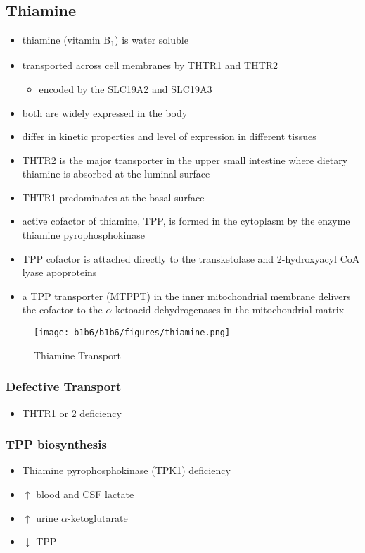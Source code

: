 \documentclass{scrartcl}
\begin{document}
\subsection{Thiamine}
\label{sec:orgb77186b}
\begin{itemize}
\item thiamine (vitamin B\textsubscript{1}) is water soluble
\item transported across cell membranes by THTR1 and THTR2
\begin{itemize}
\item encoded by the SLC19A2 and SLC19A3
\end{itemize}
\item both are widely expressed in the body
\item differ in kinetic properties and level of expression in different tissues
\item THTR2 is the major transporter in the upper small intestine where
dietary thiamine is absorbed at the luminal surface
\item THTR1 predominates at the basal surface
\item active cofactor of thiamine, TPP, is formed in the cytoplasm by the
enzyme thiamine pyrophosphokinase
\item TPP cofactor is attached directly to the transketolase and 2-hydroxyacyl CoA lyase apoproteins
\item a TPP transporter (MTPPT) in the inner mitochondrial membrane
delivers the cofactor to the \(\alpha\)-ketoacid dehydrogenases in the
mitochondrial matrix
\end{itemize}

\begin{figure}[htbp]
\centering
\texttt{[image: b1b6/b1b6/figures/thiamine.png]}
\caption{\label{fig:org87dd777}Thiamine Transport}
\end{figure}

\subsubsection{Defective Transport}
\label{sec:org4f10db4}
\begin{itemize}
\item THTR1 or 2 deficiency
\end{itemize}
\subsubsection{TPP biosynthesis}
\label{sec:orgf9a1214}
\begin{itemize}
\item Thiamine pyrophosphokinase (TPK1) deficiency
\item \(\uparrow\) blood and CSF lactate
\item \(\uparrow\) urine \(\alpha\)-ketoglutarate
\item \(\downarrow\) TPP
\end{itemize}
\end{document}
